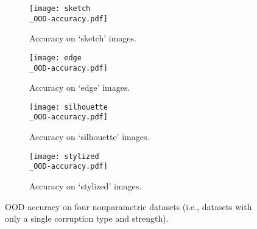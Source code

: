 \begin{figure}[h]
	\begin{subfigure}{0.49\linewidth}
		\centering
		\texttt{[image: sketch\\\_OOD-accuracy.pdf]}
		\caption{Accuracy on `sketch' images.}
		\label{subfig:accuracy_sketch}
		\vspace{\captionspaceII}
	\end{subfigure}\hfill
	\begin{subfigure}{0.49\linewidth}
		\centering
		\texttt{[image: edge\\\_OOD-accuracy.pdf]}
		\caption{Accuracy on `edge' images.}
		\label{subfig:accuracy_edge}
		\vspace{\captionspaceII}
	\end{subfigure}\hfill
	\begin{subfigure}{0.49\linewidth}
		\centering
		\texttt{[image: silhouette\\\_OOD-accuracy.pdf]}
		\caption{Accuracy on `silhouette' images.}
		\label{subfig:accuracy_silhouette}
		\vspace{\captionspaceII}
	\end{subfigure}\hfill
	\begin{subfigure}{0.49\linewidth}
		\centering
		\texttt{[image: stylized\\\_OOD-accuracy.pdf]}
		\caption{Accuracy on `stylized' images.}			
		\label{subfig:accuracy_stylized}
		\vspace{\captionspaceII}
	\end{subfigure}\hfill
	\caption{OOD accuracy on four nonparametric datasets (i.e., datasets with only a single corruption type and strength).}
	\label{fig:results_accuracy_nonparametric}
\end{figure}
